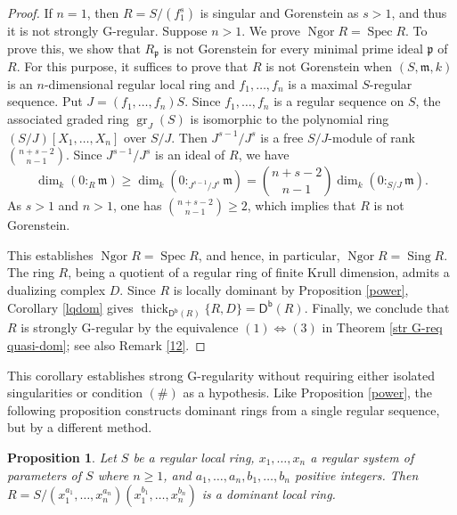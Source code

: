 \documentclass{amsart}
\newtheorem{prop}[thm]{Proposition}
\theoremstyle{definition}
\theoremstyle{remark}
\numberwithin{equation}{thm}
\def\Db{\operatorname{\mathsf{D^b}}}
\def\ge{\geqslant}
\def\m{\mathfrak{m}}
\def\ng{\operatorname{Ngor}}
\def\p{\mathfrak{p}}
\def\sing{\operatorname{Sing}}
\def\spec{\operatorname{Spec}}
\def\thick{\operatorname{thick}}
\begin{document}
\begin{proof}
If $n=1$, then $R=S/(f_1^s)$ is singular and Gorenstein as $s>1$, and thus it is not strongly G-regular. Suppose $n>1$. We prove $\ng R=\spec R$. To prove this, we show that $R_\p$ is not Gorenstein for every minimal prime ideal $\p$ of $R$. For this purpose, it suffices to prove that $R$ is not Gorenstein when $(S,\m,k)$ is an $n$-dimensional regular local ring and $f_1,\ldots,f_n$ is a maximal $S$-regular sequence. Put $J=(f_1,\ldots,f_n)S$. Since $f_1,\ldots,f_n$ is a regular sequence on $S$, the associated graded ring $\operatorname{gr}_J(S)$ is isomorphic to the polynomial ring $(S/J)[X_1,\ldots, X_n]$ over $S/J$. Then $J^{s-1}/J^s$ is a free $S/J$-module of rank $\binom{n+s-2}{n-1}$. Since $J^{s-1}/J^s$ is an ideal of $R$, we have 
$$
\dim_k (0:_R \m)\ge \dim_k (0:_{J^{s-1}/J^s} \m)= \binom{n+s-2}{n-1} \dim_k (0:_{S/J} \m).
$$
As $s>1$ and $n>1$, one has $\binom{n+s-2}{n-1}\ge 2$, which implies that $R$ is not Gorenstein. 

This establishes $\ng R=\spec R$, and hence, in particular, $\ng R=\sing R$. The ring $R$, being a quotient of a regular ring of finite Krull dimension, admits a dualizing complex $D$. Since $R$ is locally dominant by Proposition \ref{power}, Corollary \ref{lqdom} gives $\thick_{\Db(R)}\{R, D\}=\Db(R)$. Finally, we conclude that $R$ is strongly G-regular by the equivalence $(1)\Leftrightarrow(3)$ in Theorem \ref{str G-req quasi-dom}; see also Remark \ref{12}.%
\end{proof}

This corollary establishes strong G-regularity without requiring either isolated singularities or condition $(\#)$ as a hypothesis.
Like Proposition \ref{power}, the following proposition constructs dominant rings from a single regular sequence, but by a different method.

\begin{prop}\label{T23(8.8)}
Let $S$ be a regular local ring, $x_1,\ldots,x_n$ a regular system of parameters of $S$ where $n\ge 1$, and $a_1,\ldots,a_n, b_1,\ldots,b_n$ positive integers. Then $R=S/(x_1^{a_1},\ldots,x_n^{a_n})(x_1^{b_1},\ldots,x_n^{b_n})$ is a dominant local ring.
\end{prop}
\end{document}
